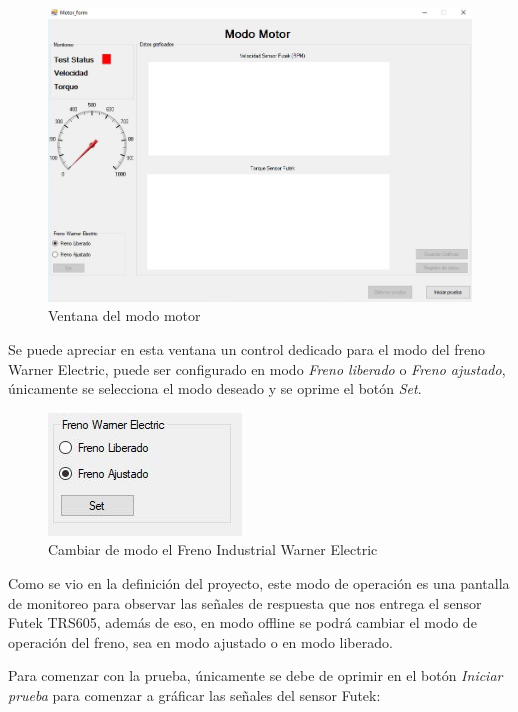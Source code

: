 \documentclass[12pt,titlepage]{article}
\begin{document}
\begin{figure}[htbp]
\hspace*{2.8cm} 
\includegraphics[scale=0.50]{Motor_form}
\caption{Ventana del modo motor}
\end{figure}
Se puede apreciar en esta ventana un control dedicado para el modo del freno Warner Electric, puede ser configurado en modo \textit{Freno liberado} o \textit{Freno ajustado}, únicamente se selecciona el modo deseado y se oprime el botón \textit{Set}. \\ 

\begin{figure}[htbp]
\hspace*{6.8cm} 
\includegraphics[scale=0.77]{Freno_seett}
\caption{Cambiar de modo el Freno Industrial Warner Electric}
\end{figure}

Como se vio en la definición del proyecto, este modo de operación es una pantalla de monitoreo para observar las señales de respuesta que nos entrega el sensor Futek TRS605, además de eso, en modo offline se podrá cambiar el modo de operación del freno, sea en modo ajustado o en modo liberado. 

\newpage

Para comenzar con la prueba, únicamente se debe de oprimir en el botón \textit{Iniciar prueba} para comenzar a gráficar las señales del sensor Futek: \\ 
\end{document}
